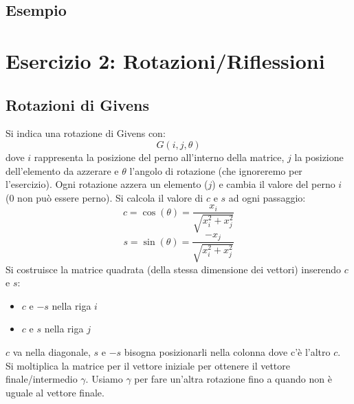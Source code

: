 \documentclass[10pt]{article}
\begin{document}
\subsection*{Esempio}
\section{Esercizio 2: Rotazioni/Riflessioni}
\subsection{Rotazioni di Givens}
Si indica una rotazione di Givens con:
\begin{equation*}
    G(i,j,\theta)
\end{equation*}
dove $i$ rappresenta la posizione del perno all'interno della matrice, $j$ la posizione dell'elemento da azzerare e $\theta$ l'angolo di rotazione (che ignoreremo per l'esercizio). Ogni rotazione azzera un elemento ($j$) e cambia il valore del perno $i$ (0 non può essere perno). Si calcola il valore di $c$ e $s$ ad ogni passaggio:
\begin{equation*}
    c = \cos(\theta)=\frac{x_{i}}{\sqrt{x_{i}^{2}+x_{j}^{2}}}
\end{equation*}
\begin{equation*}
    s = \sin(\theta)=\frac{-x_{j}}{\sqrt{x_{i}^{2}+x_{j}^{2}}}
\end{equation*}
Si costruisce la matrice quadrata (della stessa dimensione dei vettori) inserendo $c$ e $s$:
\begin{itemize}
    \item $c$ e $-s$ nella riga $i$
    \item $c$ e $s$ nella riga $j$ 
\end{itemize}
$c$ va nella diagonale, $s$ e $-s$ bisogna posizionarli nella colonna dove c'è l'altro $c$.\\
Si moltiplica la matrice per il vettore iniziale per ottenere il vettore finale/intermedio $\gamma$. Usiamo $\gamma$ per fare un'altra rotazione fino a quando non è uguale al vettore finale.\\
\end{document}
